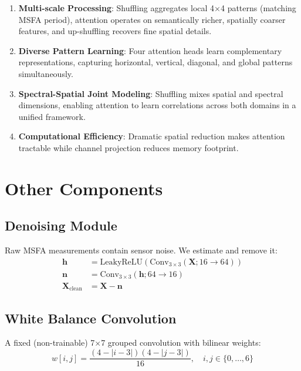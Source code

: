 \documentclass[conference]{IEEEtran}
\begin{document}
\begin{enumerate}
    \item \textbf{Multi-scale Processing}: Shuffling aggregates local 4×4 patterns (matching MSFA period), attention operates on semantically richer, spatially coarser features, and up-shuffling recovers fine spatial details.
    
    \item \textbf{Diverse Pattern Learning}: Four attention heads learn complementary representations, capturing horizontal, vertical, diagonal, and global patterns simultaneously.
    
    \item \textbf{Spectral-Spatial Joint Modeling}: Shuffling mixes spatial and spectral dimensions, enabling attention to learn correlations across both domains in a unified framework.
    
    \item \textbf{Computational Efficiency}: Dramatic spatial reduction makes attention tractable while channel projection reduces memory footprint.
\end{enumerate}

\section{Other Components}

\subsection{Denoising Module}

Raw MSFA measurements contain sensor noise. We estimate and remove it:
\begin{equation}
\begin{aligned}
\mathbf{h} &= \text{LeakyReLU}(\text{Conv}_{3\times3}(\mathbf{X}; 16 \rightarrow 64)) \\
\mathbf{n} &= \text{Conv}_{3\times3}(\mathbf{h}; 64 \rightarrow 16) \\
\mathbf{X}_{\text{clean}} &= \mathbf{X} - \mathbf{n}
\end{aligned}
\end{equation}

\subsection{White Balance Convolution}

A fixed (non-trainable) 7×7 grouped convolution with bilinear weights:
\begin{equation}
w[i,j] = \frac{(4-|i-3|)(4-|j-3|)}{16}, \quad i,j \in \{0,\ldots,6\}
\end{equation}
\end{document}
